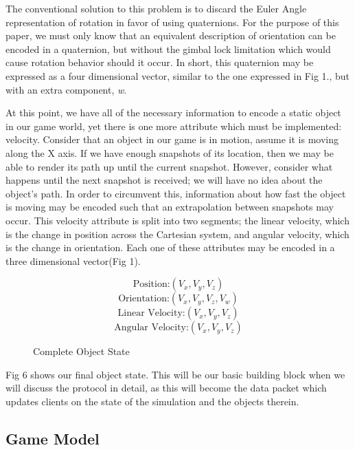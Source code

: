 \documentclass[conference]{IEEEtran}
\begin{document}
The conventional solution to this problem is to discard the Euler Angle representation of rotation in favor of using quaternions. 
For the purpose of this paper, we must only know that an equivalent description of orientation can be encoded in a quaternion,
but without the gimbal lock limitation which would cause rotation behavior should it occur. In short, this quaternion may be expressed as a four dimensional
vector, similar to the one expressed in Fig 1., but with an extra component, \textit{w}. 

At this point, we have all of the necessary information to encode a static object in our game world, yet there is one more attribute which
must be implemented: velocity. Consider that an object in our game is in motion, assume it is moving along the X axis. If we have enough snapshots of its location,
then we may be able to render its path up until the current snapshot. However, consider what happens until the next snapshot is received; we will have no idea about the object's path. 
In order to circumvent this, information about how fast the object is moving may be encoded such that an extrapolation between snapshots may occur. This velocity attribute 
is split into two segments; the linear velocity, which is the change in position across the Cartesian system, and angular velocity, which is the change in orientation. 
Each one of these attributes may be encoded in a three dimensional vector(Fig 1).

\begin{figure}[htbp]
\begin{equation}
\text {Position:} (V_{x}, V_{y}, V_{z})
\end{equation}
\begin{equation}
\text {Orientation:} (V_{x}, V_{y}, V_{z}, V_{w})
\end{equation}
\begin{equation}
\text {Linear Velocity:} (V_{x}, V_{y}, V_{z})
\end{equation}
\begin{equation}
\text {Angular Velocity:} (V_{x}, V_{y}, V_{z})
\end{equation}
\caption{Complete Object State}
\end{figure}

Fig 6 shows our final object state. This will be our basic building block when we will discuss the protocol in detail, 
as this will become the data packet which updates clients on the state of the simulation and the objects therein. 

\subsection{Game Model}
\end{document}

